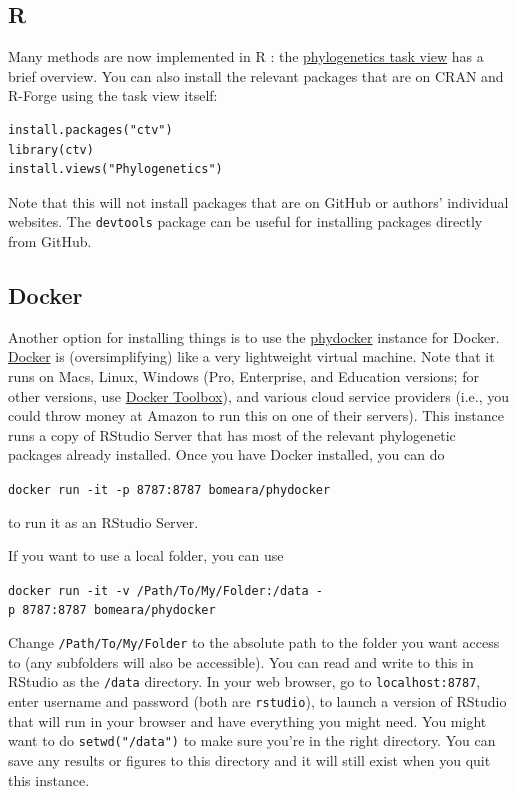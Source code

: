 \documentclass[]{book}
\theoremstyle{definition}
\theoremstyle{definition}
\theoremstyle{remark}
\begin{document}
\subsection{R}\label{r}

Many methods are now implemented in R \citep{R-base}: the
\href{http://cran.r-project.org/web/views/Phylogenetics.html}{phylogenetics
task view} has a brief overview. You can also install the relevant
packages that are on CRAN and R-Forge using the task view itself:

\begin{verbatim}
install.packages("ctv")
library(ctv)
install.views("Phylogenetics")
\end{verbatim}

Note that this will not install packages that are on GitHub or authors'
individual websites. The \texttt{devtools} package can be useful for
installing packages directly from GitHub.

\subsection{Docker}\label{docker}

Another option for installing things is to use the
\href{https://hub.docker.com/r/bomeara/phydocker/}{phydocker} instance
for Docker. \href{https://www.docker.com}{Docker} is (oversimplifying)
like a very lightweight virtual machine. Note that it runs on Macs,
Linux, Windows (Pro, Enterprise, and Education versions; for other
versions, use
\href{https://docs.docker.com/toolbox/toolbox_install_windows/}{Docker
Toolbox}), and various cloud service providers (i.e., you could throw
money at Amazon to run this on one of their servers). This instance runs
a copy of RStudio Server that has most of the relevant phylogenetic
packages already installed. Once you have Docker installed, you can do

\texttt{docker\ run\ -it\ -p\ 8787:8787\ bomeara/phydocker}

to run it as an RStudio Server.

If you want to use a local folder, you can use

\texttt{docker\ run\ -it\ -v\ /Path/To/My/Folder:/data\ -p\ 8787:8787\ bomeara/phydocker}

Change \texttt{/Path/To/My/Folder} to the absolute path to the folder
you want access to (any subfolders will also be accessible). You can
read and write to this in RStudio as the \texttt{/data} directory. In
your web browser, go to \texttt{localhost:8787}, enter username and
password (both are \texttt{rstudio}), to launch a version of RStudio
that will run in your browser and have everything you might need. You
might want to do \texttt{setwd("/data")} to make sure you're in the
right directory. You can save any results or figures to this directory
and it will still exist when you quit this instance.
\end{document}
